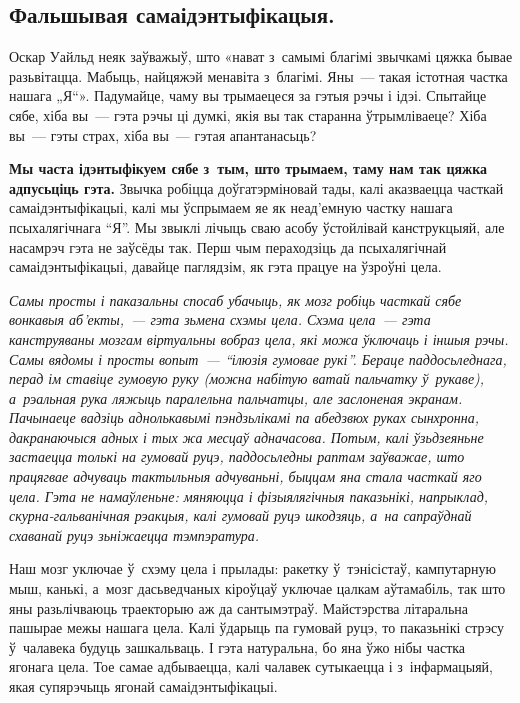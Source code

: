 \subsection*{Фальшывая самаідэнтыфікацыя.}

Оскар Уайльд неяк заўважыў, што «нават з~самымі благімі звычкамі цяжка бывае разьвітацца. Мабыць, найцяжэй менавіта з~благімі. Яны~--- такая істотная частка нашага „Я“». Падумайце, чаму вы трымаецеся за гэтыя рэчы і ідэі. Спытайце сябе, хіба вы~--- гэта рэчы ці думкі, якія вы так старанна ўтрымліваеце? Хіба вы~--- гэты страх, хіба вы~--- гэтая апантанасьць?

\textbf{Мы часта ідэнтыфікуем сябе з~тым, што трымаем, таму нам так цяжка адпусьціць гэта.} Звычка робіцца доўгатэрміновай тады, калі аказваецца часткай самаідэнтыфікацыі, калі мы ўспрымаем яе як неад'емную частку нашага псыхалягічнага ``Я''. Мы звыклі лічыць сваю асобу ўстойлівай канструкцыяй, але насамрэч гэта не заўсёды так. Перш чым пераходзіць да псыхалягічнай самаідэнтыфікацыі, давайце паглядзім, як гэта працуе на ўзроўні цела.

\emph{Самы просты і паказальны спосаб убачыць, як мозг робіць часткай сябе вонкавыя аб'екты,~--- гэта зьмена схэмы цела. Схэма цела~--- гэта канструяваны мозгам віртуальны вобраз цела, які можа ўключаць і іншыя рэчы. Самы вядомы і просты вопыт~--- ``ілюзія гумовае рукі''. Бераце паддосьледнага, перад ім ставіце гумовую руку (можна набітую ватай пальчатку ў~рукаве), а~рэальная рука ляжыць паралельна пальчатцы, але заслоненая экранам. Пачынаеце вадзіць аднолькавымі пэндзьлікамі па абедзвюх руках сынхронна, дакранаючыся адных і тых жа месцаў адначасова. Потым, калі ўзьдзеяньне застаецца толькі на гумовай руцэ, паддосьледны раптам заўважае, што працягвае адчуваць тактыльныя адчуваньні, быццам яна стала часткай яго цела. Гэта не намаўленьне: мяняюцца і фізыялягічныя паказьнікі, напрыклад, скурна-гальванічная рэакцыя, калі гумовай руцэ шкодзяць, а~на сапраўднай схаванай руцэ зьніжаецца тэмпэратура.}

Наш мозг уключае ў~схэму цела і прылады: ракетку ў~тэнісістаў, кампутарную мыш, канькі, а~мозг дасьведчаных кіроўцаў уключае цалкам аўтамабіль, так што яны разьлічваюць траекторыю аж да сантымэтраў. Майстэрства літаральна пашырае межы нашага цела. Калі ўдарыць па гумовай руцэ, то паказьнікі стрэсу ў~чалавека будуць зашкальваць. І гэта натуральна, бо яна ўжо нібы частка ягонага цела. Тое самае адбываецца, калі чалавек сутыкаецца і з~інфармацыяй, якая супярэчыць ягонай самаідэнтыфікацыі.


